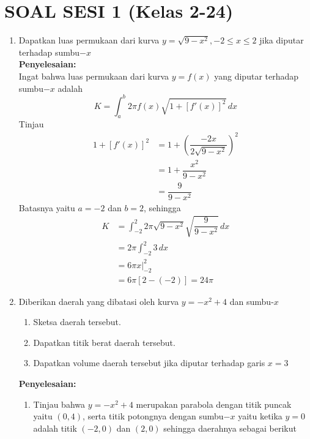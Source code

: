 \documentclass{article}
\begin{document}
\section*{SOAL SESI 1 (Kelas 2-24)}
\begin{enumerate}
	\item Dapatkan luas permukaan dari kurva $y=\sqrt{9-x^2}, -2\leq x\leq 2$ jika diputar terhadap sumbu$-x$\\
	\textbf{Penyelesaian:}\\
	Ingat bahwa luas permukaan dari kurva $y=f(x)$ yang diputar terhadap sumbu$-x$ adalah
	$$ K=\int_a^b 2\pi f(x)\sqrt{1+[f'(x)]^2}\, dx $$
	Tinjau 
	\begin{align*}
	1+[f'(x)]^2 &= 1+\left(\dfrac{-2x}{2\sqrt{9-x^2}}\right)^2\\
	&= 1+ \dfrac{x^2}{9-x^2}\\
	&= \dfrac{9}{9-x^2}
	\end{align*}
	Batasnya yaitu $a=-2$ dan $b=2$, sehingga
	\begin{align*}
	K &=\int_{-2}^2 2\pi \sqrt{9-x^2}\sqrt{\dfrac{9}{9-x^2}}\, dx\\
	&= 2\pi \int_{-2}^2 3\, dx\\
	&= 6\pi x\big|^2_{-2}\\
	&= 6\pi [2-(-2)] = 24\pi
	\end{align*}
	\item Diberikan daerah yang dibatasi oleh kurva $y=-x^2+4$ dan sumbu-$x$
	\begin{enumerate}
		\item Sketsa daerah tersebut.
		\item Dapatkan titik berat daerah tersebut.
		\item Dapatkan volume daerah tersebut jika diputar terhadap garis $x=3$
	\end{enumerate}
	\textbf{Penyelesaian:}
	\begin{enumerate}
		\item Tinjau bahwa $y=-x^2+4$ merupakan parabola dengan titik puncak yaitu $(0,4)$, serta titik potongnya dengan sumbu$-x$ yaitu ketika $y=0$ adalah titik $(-2,0)$ dan $(2,0)$ sehingga daerahnya sebagai berikut
		\begin{center}
\end{center}
\end{enumerate}
\end{enumerate}
\end{document}
